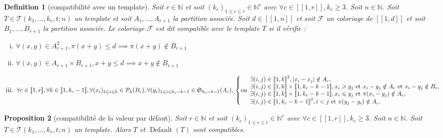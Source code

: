 \documentclass{article}
\newtheorem{definition}{Definition}[section]
\newtheorem{proposition}[definition]{Proposition}
\DeclareMathOperator{\findef}{Default}
\begin{document}
\begin{definition}[compatibilité avec un template]
Soit \(r \in \mathbb{N}\) et soit \((k_c)_{1 \leqslant c \leqslant r} \in \mathbb{N}^r\) avec \(\forall c \in [\![1,r]\!], k_c \geqslant 3\). Soit \(n \in \mathbb{N}\). Soit \(T \in \mathcal{T}(k_1, ..., k_r, t; n)\) un template et soit \(A_1, ..., A_{r+1}\) la partition associée. Soit \(d \in [\![1, n]\!]\) et soit \(\mathcal{F}\) un coloriage de \([\![1, d]\!]\) et soit \(B_1, ..., B_{r+1}\) la partition associée. Le coloriage \(\mathcal{F}\) est dit compatible avec le template \(T\) si il vérifie :
\begin{enumerate}[(i)]
\item \(\forall (x,y) \in A_{r+1}^2, \pi(x + y) \leqslant d \implies \pi(x + y)  \notin B_{r+1}\)
\item \(\forall (x,y) \in A_{r+1} \times B_{r+1}, x + y \leqslant d \implies x + y  \notin B_{r+1}\)
\item \(\forall c \in [\![1, r]\!], \forall k \in [\![1, k_c-1]\!], \forall (x_i)_{1 \leqslant i \leqslant k} \in\mathcal{P}_k(B_c), \forall (y_i)_{1 \leqslant i \leqslant k_c - k - 1} \in \mathfrak{S}_{k_c - k - 1}(A_c), \\
	\left\{ \text{ou} 
	\begin{array}{l}
		\exists (i, j) \in {[\![1, k]\!]}^2, |x_i - x_j| \notin A_c, \\
		\exists (i, j) \in [\![1, k]\!] \times [\![1, k_c - k - 1]\!], x_i \geqslant y_j  ~\text{et}~ x_i - y_j \notin A_c ~\text{et}~  x_i - y_j  \notin B_c, \\
		\exists (i, j) \in [\![1, k]\!] \times [\![1, k_c - k - 1]\!], x_i \leqslant y_j  ~\text{et}~ \pi(x_i - y_j) \notin A_c, \\
		\exists (i, j) \in {[\![1, k_c - k - 1]\!]}^2, i < j ~\text{et}~ \pi(y_j - y_i) \notin A_c.
	\end{array}
	\right.\)
\end{enumerate}
\end{definition}

\begin{proposition}[compatibilité de la valeur par défaut]
Soit \(r \in \mathbb{N}\) et soit \((k_c)_{1 \leqslant c \leqslant r} \in \mathbb{N}^r\) avec \(\forall c \in [\![1,r]\!], k_c \geqslant 3\). Soit \(n \in \mathbb{N}\). Soit \(T \in \mathcal{T}(k_1, ..., k_r, t; n)\) un template. Alors \(T\) et \(\findef(T)\) sont compatibles.
\end{proposition}
\end{document}
